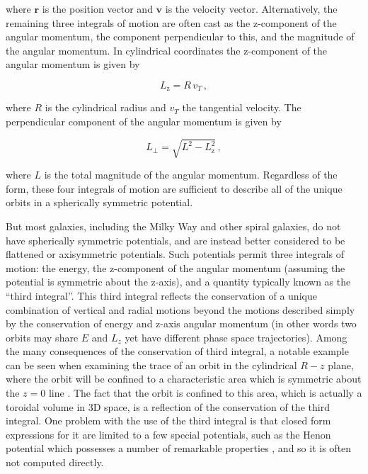 \noindent where $\mathbf{r}$ is the position vector and $\mathbf{v}$ is the velocity vector. Alternatively, the remaining three integrals of motion are often cast as the z-component of the angular momentum, the component perpendicular to this, and the magnitude of the angular momentum. In cylindrical coordinates the z-component of the angular momentum is given by

\begin{equation}
    \label{ch1:eq:z-angular-momentum}
    L_\mathrm{z} = R \, v_{T}\,,
\end{equation}

\noindent where $R$ is the cylindrical radius and $v_{T}$ the tangential velocity. The perpendicular component of the angular momentum is given by

\begin{equation}
    \label{ch1:eq:perpendicular-angular-momentum}
    L_{\perp} = \sqrt{ L^{2} - L_{\mathrm{z}}^{2} }\,,
\end{equation}

\noindent where $L$ is the total magnitude of the angular momentum. Regardless of the form, these four integrals of motion are sufficient to describe all of the unique orbits in a spherically symmetric potential.

But most galaxies, including the Milky Way and other spiral galaxies, do not have spherically symmetric potentials, and are instead better considered to be flattened or axisymmetric potentials. Such potentials permit three integrals of motion: the energy, the z-component of the angular momentum (assuming the potential is symmetric about the z-axis), and a quantity typically known as the ``third integral''. This third integral reflects the conservation of a unique combination of vertical and radial motions beyond the motions described simply by the conservation of energy and z-axis angular momentum (in other words two orbits may share $E$ and $L_{z}$ yet have different phase space trajectories). Among the many consequences of the conservation of third integral, a notable example can be seen when examining the trace of an orbit in the cylindrical $R-z$ plane, where the orbit will be confined to a characteristic area which is symmetric about the $z=0$ line \parencite[see figure 3.4 in][]{binney08}. The fact that the orbit is confined to this area, which is actually a toroidal volume in 3D space, is a reflection of the conservation of the third integral. One problem with the use of the third integral is that closed form expressions for it are limited to a few special potentials, such as the Henon potential which possesses a number of remarkable properties \parencite{henon59a,binney14e}, and so it is often not computed directly.

